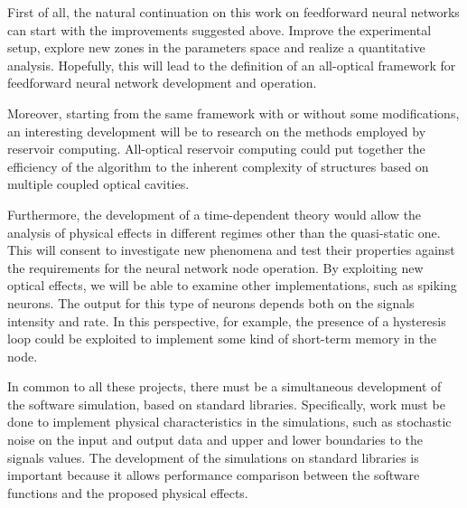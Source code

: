 First of all, the natural continuation on this work on feedforward neural networks can start with the improvements suggested above.
Improve the experimental setup, explore new zones in the parameters space and realize a quantitative analysis.
Hopefully, this will lead to the definition of an all-optical framework for feedforward neural network development and operation.

Moreover, starting from the same framework with or without some modifications, an interesting development will be to research on the methods employed by reservoir computing.
All-optical reservoir computing could put together the efficiency of the algorithm to the inherent complexity of structures based on multiple coupled optical cavities.

Furthermore, the development of a time-dependent theory would allow the analysis of physical effects in different regimes other than the quasi-static one.
This will consent to investigate new phenomena and test their properties against the requirements for the neural network node operation.
By exploiting new optical effects, we will be able to examine other implementations, such as spiking neurons.
The output for this type of neurons depends both on the signals intensity and rate.
In this perspective, for example, the presence of a hysteresis loop could be exploited to implement some kind of short-term memory in the node.

In common to all these projects, there must be a simultaneous development of the software simulation, based on standard libraries.
Specifically, work must be done to implement physical characteristics in the simulations, such as stochastic noise on the input and output data and upper and lower boundaries to the signals values.
The development of the simulations on standard libraries is important because it allows performance comparison between the software functions and the proposed physical effects.
